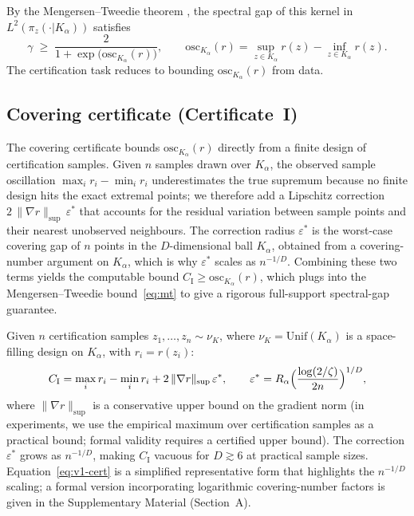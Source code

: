 \documentclass[12pt]{article}
\newcommand{\osc}{\mathrm{osc}}
\begin{document}
By the Mengersen--Tweedie theorem \citep{MengersenTweedie1996}, the spectral gap of this kernel in $L^2(\pi_z(\cdot | K_\alpha))$ satisfies
\begin{equation}\label{eq:mt}
  \gamma \;\ge\; \frac{2}{1 + \exp\!\bigl(\osc_{K_\alpha}(r)\bigr)},
  \qquad \osc_{K_\alpha}(r) = \sup_{z \in K_\alpha} r(z) - \inf_{z \in K_\alpha} r(z).
\end{equation}
The certification task reduces to bounding $\osc_{K_\alpha}(r)$ from data.


\subsection{Covering certificate (Certificate~I)}\label{sec:covering}

The covering certificate bounds $\osc_{K_\alpha}(r)$ directly from a finite design of certification samples.
Given $n$ samples drawn over $K_\alpha$, the observed sample oscillation $\max_i r_i - \min_i r_i$ underestimates the true supremum because no finite design hits the exact extremal points; we therefore add a Lipschitz correction $2\,\|\nabla r\|_{\sup}\,\varepsilon^*$ that accounts for the residual variation between sample points and their nearest unobserved neighbours.
The correction radius $\varepsilon^*$ is the worst-case covering gap of $n$ points in the $D$-dimensional ball $K_\alpha$, obtained from a covering-number argument on $K_\alpha$, which is why $\varepsilon^*$ scales as $n^{-1/D}$.
Combining these two terms yields the computable bound $C_{\mathrm{I}} \ge \osc_{K_\alpha}(r)$, which plugs into the Mengersen--Tweedie bound~\eqref{eq:mt} to give a rigorous full-support spectral-gap guarantee.

Given $n$ certification samples $z_1, \ldots, z_n \sim \nu_K$, where $\nu_K = \mathrm{Unif}(K_\alpha)$ is a space-filling design on $K_\alpha$, with $r_i = r(z_i)$:
\begin{equation}\label{eq:v1-cert}
  C_{\mathrm{I}} = \max_i r_i - \min_i r_i + 2\,\|\nabla r\|_{\sup}\,\varepsilon^*,
  \qquad \varepsilon^* = R_\alpha \Bigl(\frac{\log(2/\zeta)}{2n}\Bigr)^{1/D},
\end{equation}
where $\|\nabla r\|_{\sup}$ is a conservative upper bound on the gradient norm (in experiments, we use the empirical maximum over certification samples as a practical bound; formal validity requires a certified upper bound).
The correction $\varepsilon^*$ grows as $n^{-1/D}$, making $C_{\mathrm{I}}$ vacuous for $D \gtrsim 6$ at practical sample sizes.
Equation~\eqref{eq:v1-cert} is a simplified representative form that highlights the $n^{-1/D}$ scaling; a formal version incorporating logarithmic covering-number factors is given in the Supplementary Material (Section~A).
\end{document}
